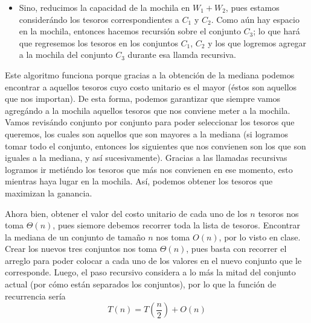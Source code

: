 \documentclass[letterpaper,11pt]{article}
\begin{document}
\begin{enumerate}
\begin{itemize}
\begin{itemize}
\begin{itemize}
\begin{itemize}
                    \item Sino, reducimos la capacidad de la mochila en 
                    $W_1 + W_2$, pues estamos considerándo los tesoros 
                    correspondientes a $C_1$ y $C_2$. Como aún hay espacio 
                    en la mochila, entonces hacemos recursión sobre el 
                    conjunto $C_3$; lo que hará que regresemos los tesoros 
                    en los conjuntos $C_1$, $C_2$ y los que logremos agregar 
                    a la mochila del conjunto $C_3$ durante esa llamda
                    recursiva. 
                \end{itemize}
            \end{itemize}

            Este algoritmo funciona porque gracias a la obtención de la 
            mediana podemos encontrar a aquellos tesoros cuyo costo unitario 
            es el mayor (éstos son aquellos que nos importan). De esta forma, 
            podemos garantizar que siempre vamos agregándo a la mochila 
            aquellos tesoros que nos conviene meter a la mochila. Vamos 
            revisándo conjunto por conjunto para poder seleccionar los 
            tesoros que queremos, los cuales son aquellos que son mayores a la 
            mediana (si logramos tomar todo el conjunto, entonces los 
            siguientes que nos convienen son los que son iguales a la mediana, 
            y así sucesivamente). Gracias a las llamadas recursivas logramos 
            ir metiéndo los tesoros que más nos convienen en ese momento, esto 
            mientras haya lugar en la mochila. Así, podemos obtener los tesoros 
            que maximizan la ganancia. 

            Ahora bien, obtener el valor del costo unitario de cada uno de los 
            $n$ tesoros nos toma $\Theta(n)$, pues siemore debemos recorrer 
            toda la lista de tesoros. Encontrar la mediana de un conjunto de 
            tamaño $n$ nos toma $O(n)$, por lo visto en clase. Crear los 
            nuevos tres conjuntos nos toma $\Theta(n)$, pues basta con recorrer 
            el arreglo para poder colocar a cada uno de los valores en el 
            nuevo conjunto que le corresponde. Luego, el paso recursivo
            considera a lo más la mitad del conjunto actual (por cómo están 
            separados los conjuntos), por lo que la función de recurrencia 
            sería 
            \begin{equation*}
                T(n) = T \left( \frac{n}{2} \right) + O(n)
            \end{equation*} 


\end{itemize}
\end{itemize}
\end{enumerate}
\end{document}

